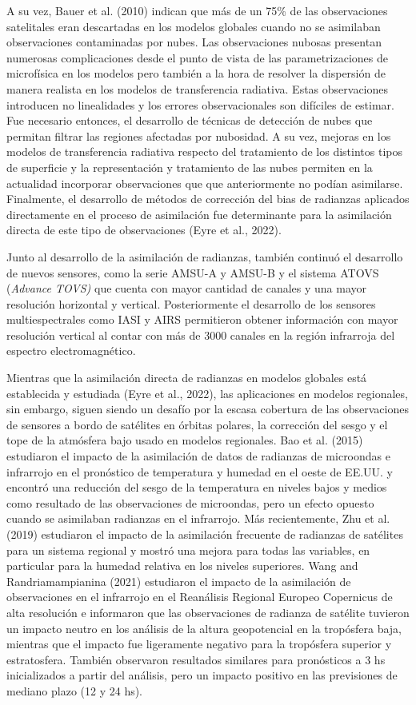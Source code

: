 \documentclass[12pt,oneside,a4paper]{reedthesis}
\begin{document}
A su vez, Bauer et al. (2010) indican que más de un 75\% de las observaciones satelitales eran descartadas en los modelos globales cuando no se asimilaban observaciones contaminadas por nubes. Las observaciones nubosas presentan numerosas complicaciones desde el punto de vista de las parametrizaciones de microfísica en los modelos pero también a la hora de resolver la dispersión de manera realista en los modelos de transferencia radiativa. Estas observaciones introducen no linealidades y los errores observacionales son difíciles de estimar. Fue necesario entonces, el desarrollo de técnicas de detección de nubes que permitan filtrar las regiones afectadas por nubosidad. A su vez, mejoras en los modelos de transferencia radiativa respecto del tratamiento de los distintos tipos de superficie y la representación y tratamiento de las nubes permiten en la actualidad incorporar observaciones que que anteriormente no podían asimilarse. Finalmente, el desarrollo de métodos de corrección del bias de radianzas aplicados directamente en el proceso de asimilación fue determinante para la asimilación directa de este tipo de observaciones (Eyre et al., 2022).

Junto al desarrollo de la asimilación de radianzas, también continuó el desarrollo de nuevos sensores, como la serie AMSU-A y AMSU-B y el sistema ATOVS (\emph{Advance TOVS)} que cuenta con mayor cantidad de canales y una mayor resolución horizontal y vertical. Posteriormente el desarrollo de los sensores multiespectrales como IASI y AIRS permitieron obtener información con mayor resolución vertical al contar con más de 3000 canales en la región infrarroja del espectro electromagnético.

Mientras que la asimilación directa de radianzas en modelos globales está establecida y estudiada (Eyre et al., 2022), las aplicaciones en modelos regionales, sin embargo, siguen siendo un desafío por la escasa cobertura de las observaciones de sensores a bordo de satélites en órbitas polares, la corrección del sesgo y el tope de la atmósfera bajo usado en modelos regionales. Bao et al. (2015) estudiaron el impacto de la asimilación de datos de radianzas de microondas e infrarrojo en el pronóstico de temperatura y humedad en el oeste de EE.UU. y encontró una reducción del sesgo de la temperatura en niveles bajos y medios como resultado de las observaciones de microondas, pero un efecto opuesto cuando se asimilaban radianzas en el infrarrojo. Más recientemente, Zhu et al. (2019) estudiaron el impacto de la asimilación frecuente de radianzas de satélites para un sistema regional y mostró una mejora para todas las variables, en particular para la humedad relativa en los niveles superiores. Wang and Randriamampianina (2021) estudiaron el impacto de la asimilación de observaciones en el infrarrojo en el Reanálisis Regional Europeo Copernicus de alta resolución e informaron que las observaciones de radianza de satélite tuvieron un impacto neutro en los análisis de la altura geopotencial en la tropósfera baja, mientras que el impacto fue ligeramente negativo para la tropósfera superior y estratosfera. También observaron resultados similares para pronósticos a 3 hs inicializados a partir del análisis, pero un impacto positivo en las previsiones de mediano plazo (12 y 24 hs).
\end{document}

